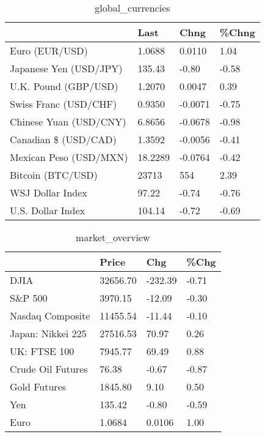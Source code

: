 \documentclass{article}%
\begin{document}
%


\begin{table}[htbp]%
\caption{global\_currencies}%
\centering%
\begin{adjustbox}{width=1\textwidth}%
\begin{tabular}{llll}
\toprule
                       &    Last &    Chng & \%Chng \\
\midrule
        Euro (EUR/USD) &  1.0688 &  0.0110 &  1.04 \\
Japanese Yen (USD/JPY) &  135.43 &   -0.80 & -0.58 \\
  U.K. Pound (GBP/USD) &  1.2070 &  0.0047 &  0.39 \\
 Swiss Franc (USD/CHF) &  0.9350 & -0.0071 & -0.75 \\
Chinese Yuan (USD/CNY) &  6.8656 & -0.0678 & -0.98 \\
  Canadian \$ (USD/CAD) &  1.3592 & -0.0056 & -0.41 \\
Mexican Peso (USD/MXN) & 18.2289 & -0.0764 & -0.42 \\
     Bitcoin (BTC/USD) &   23713 &     554 &  2.39 \\
      WSJ Dollar Index &   97.22 &   -0.74 & -0.76 \\
     U.S. Dollar Index &  104.14 &   -0.72 & -0.69 \\
\bottomrule
\end{tabular}
%
\end{adjustbox}%
\end{table}

%


\begin{table}[htbp]%
\caption{market\_overview}%
\centering%
\begin{adjustbox}{width=1\textwidth}%
\begin{tabular}{llll}
\toprule
                  &    Price &     Chg &  \%Chg \\
\midrule
             DJIA & 32656.70 & -232.39 & -0.71 \\
          S\&P 500 &  3970.15 &  -12.09 & -0.30 \\
 Nasdaq Composite & 11455.54 &  -11.44 & -0.10 \\
Japan: Nikkei 225 & 27516.53 &   70.97 &  0.26 \\
     UK: FTSE 100 &  7945.77 &   69.49 &  0.88 \\
Crude Oil Futures &    76.38 &   -0.67 & -0.87 \\
     Gold Futures &  1845.80 &    9.10 &  0.50 \\
              Yen &   135.42 &   -0.80 & -0.59 \\
             Euro &   1.0684 &  0.0106 &  1.00 \\
\bottomrule
\end{tabular}
%
\end{adjustbox}%
\end{table}

%
\end{document}
